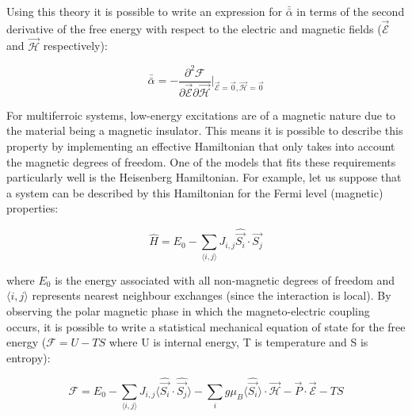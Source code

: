 \documentclass[10pt]{article}
\begin{document}
Using this theory it is possible to write an expression for $\bar{\bar{\alpha}}$ in terms of the second derivative of the free energy with respect to the electric and magnetic fields ($\vec{\mathcal{E}}$ and $\vec{\mathcal{H}}$ respectively):

\begin{equation*}
\bar{\bar{\alpha}} = -\frac{\partial^2 \mathcal{F}}{\partial \vec{\mathcal{E}}\partial\vec{\mathcal{H}}}\biggr\vert_{\vec{\mathcal{E}}=\vec{0}, \vec{\mathcal{H}} = \vec{0}}
\end{equation*}

For multiferroic systems, low-energy excitations are of a magnetic nature due to the material being a magnetic insulator. This means it is possible to describe this property by implementing an effective Hamiltonian that only takes into account the magnetic degrees of freedom. One of the models that fits these requirements particularly well is the Heisenberg Hamiltonian. For example, let us suppose that a system can be described by this Hamiltonian for the Fermi level (magnetic) properties:

\begin{equation*}
\hat{H} = E_0 - \sum_{\langle i,j \rangle} J_{i,j}\hat{\vec{S_i}}\cdot \hat{\vec{S_j}}
\end{equation*}

where $E_0$ is the energy associated with all non-magnetic degrees of freedom and $\langle i,j \rangle$ represents nearest neighbour exchanges (since the interaction is local). By observing the polar magnetic phase in which the magneto-electric coupling occurs, it is possible to write a statistical mechanical equation of state for the free energy ($\mathcal{F} = U - TS$ where U is internal energy, T is temperature and S is entropy):

\begin{equation*}
\mathcal{F} = E_0 - \sum_{\langle i,j \rangle} J_{i,j}\langle \hat{\vec{S_i}}\cdot \hat{\vec{S_j}} \rangle - \sum_{i}g\mu_{B}\langle \hat{\vec{S_i}}\rangle \cdot \mathcal{\vec{H}} - \vec{P}\cdot \mathcal{\vec{E}} - TS
\end{equation*}
\end{document}
